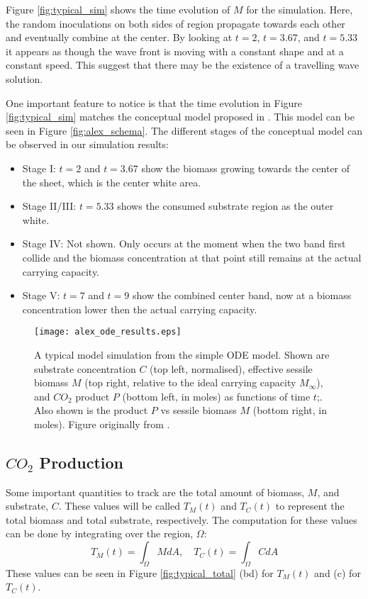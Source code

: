 Figure \ref{fig:typical_sim} shows the time evolution of $M$ for the simulation.
Here, the random inoculations on both sides of region propagate towards each other and eventually combine at the center.
By looking at $t=2$, $t=3.67$, and $t = 5.33$ it appears as though the wave front is moving with a constant shape and at a constant speed.
This suggest that there may be the existence of a travelling wave solution.

One important feature to notice is that the time evolution in Figure \ref{fig:typical_sim} matches the conceptual model proposed in \cite{dumitrache2015mathematicalModeling}.
This model can be seen in Figure \ref{fig:alex_schema}.
The different stages of the conceptual model can be observed in our simulation results: 
\begin{itemize}
  \item Stage I: $t = 2$ and $t = 3.67$ show the biomass growing towards the center of the sheet, which is the center white area.
  \item Stage II/III: $t = 5.33$ shows the consumed substrate region as the outer white.
  \item Stage IV: Not shown. Only occurs at the moment when the two band first collide and the biomass concentration at that point still remains at the actual carrying capacity.
  \item Stage V: $t = 7$ and $t = 9$ show the combined center band, now at a biomass concentration lower then the actual carrying capacity.
\end{itemize}

\begin{figure}[!htp]
  \centering
  \texttt{[image: alex\_ode\_results.eps]}
  \caption{A typical model simulation from the simple ODE model.
    Shown are substrate concentration $C$ (top left, normalised), effective sessile biomass $M$ (top right, relative to the ideal carrying capacity $M_{\infty}$), and $CO_2$ product $P$ (bottom left, in moles) as functions of time $t$;.
    Also shown is the product $P$ vs sessile biomass $M$ (bottom right, in moles).
    Figure originally from \cite{dumitrache2015mathematicalModeling}.
  }
  \label{fig:alex_ode_results}
\end{figure}

\subsection{$CO_2$ Production}

Some important quantities to track are the total amount of biomass, $M$, and substrate, $C$. 
These values will be called $T_M(t)$ and $T_C(t)$ to represent the total biomass and total substrate, respectively.
The computation for these values can be done by integrating over the region, $\Omega$:
\begin{equation}
  T_M(t) = \int_{\Omega} M dA, \quad T_C(t) = \int_{\Omega} C dA
\end{equation}
These values can be seen in Figure \ref{fig:typical_total} (bd) for $T_M(t)$ and (c) for $T_C(t)$.

